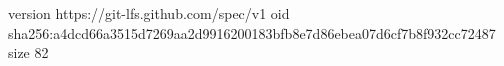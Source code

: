 version https://git-lfs.github.com/spec/v1
oid sha256:a4dcd66a3515d7269aa2d9916200183bfb8e7d86ebea07d6cf7b8f932cc72487
size 82

